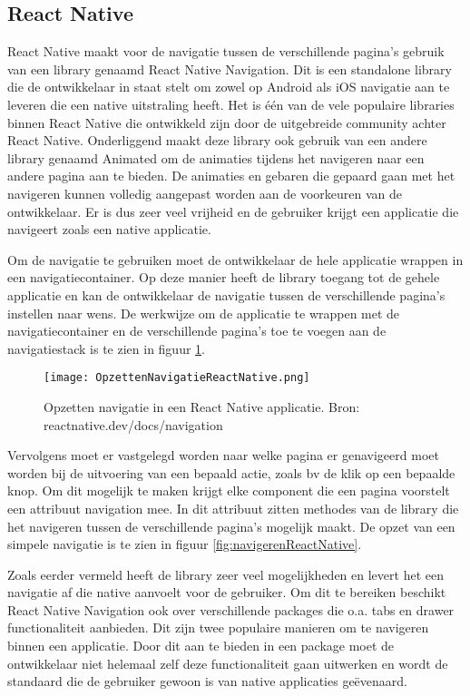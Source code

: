 \subsection{React Native}
\label{subsubsec:navigatieReactNative}

React Native maakt voor de navigatie tussen de verschillende pagina's gebruik van een library genaamd React Native Navigation. Dit is een standalone library die de ontwikkelaar in staat stelt om zowel op Android als iOS navigatie aan te leveren die een native uitstraling heeft. Het is één van de vele populaire libraries binnen React Native die ontwikkeld zijn door de uitgebreide community achter React Native. Onderliggend maakt deze library ook gebruik van een andere library genaamd Animated om de animaties tijdens het navigeren naar een andere pagina aan te bieden. De animaties en gebaren die gepaard gaan met het navigeren kunnen volledig aangepast worden aan de voorkeuren van de ontwikkelaar. Er is dus zeer veel vrijheid en de gebruiker krijgt een applicatie die navigeert zoals een native applicatie. 

Om de navigatie te gebruiken moet de ontwikkelaar de hele applicatie wrappen in een navigatiecontainer. Op deze manier heeft de library toegang tot de gehele applicatie en kan de ontwikkelaar de navigatie tussen de verschillende pagina's instellen naar wens. De werkwijze om de applicatie te wrappen met de navigatiecontainer en de verschillende pagina's toe te voegen aan de navigatiestack is te zien in figuur \ref{fig:opzettenNavigatieReactNative}.

\begin{figure}
    \texttt{[image: OpzettenNavigatieReactNative.png]}
    \caption{Opzetten navigatie in een React Native applicatie. Bron: reactnative.dev/docs/navigation}
    \label{fig:opzettenNavigatieReactNative}
\end{figure}

Vervolgens moet er vastgelegd worden naar welke pagina er genavigeerd moet worden bij de uitvoering van een bepaald actie, zoals bv de klik op een bepaalde knop. Om dit mogelijk te maken krijgt elke component die een pagina voorstelt een attribuut navigation mee. In dit attribuut zitten methodes van de library die het navigeren tussen de verschillende pagina's mogelijk maakt. De opzet van een simpele navigatie is te zien in figuur \ref{fig:navigerenReactNative}. 

Zoals eerder vermeld heeft de library zeer veel mogelijkheden en levert het een navigatie af die native aanvoelt voor de gebruiker. Om dit te bereiken beschikt React Native Navigation ook over verschillende packages die o.a. tabs en drawer functionaliteit aanbieden. Dit zijn twee populaire manieren om te navigeren binnen een applicatie. Door dit aan te bieden in een package moet de ontwikkelaar niet helemaal zelf deze functionaliteit gaan uitwerken en wordt de standaard die de gebruiker gewoon is van native applicaties geëvenaard.


